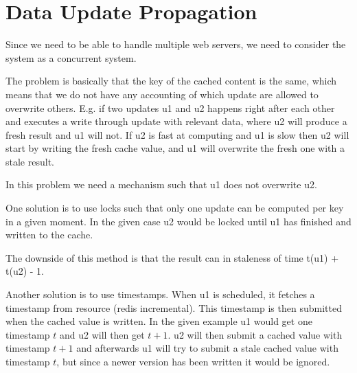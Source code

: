 \chapter{Data Update Propagation}
\label{chapter:update_propagation}

%
%
%



Since we need to be able to handle multiple web servers, we need to consider
the system as a concurrent system.

The problem is basically that the key of the cached content is the same, which
means that we do not have any accounting of which update are allowed to
overwrite others. E.g. if two updates u1 and u2 happens right after each other
and executes a write through update with relevant data, where u2 will produce
a fresh result and u1 will not. If u2 is fast at computing and u1 is slow then
u2 will start by writing the fresh cache value, and u1 will overwrite the
fresh one with a stale result.

In this problem we need a mechanism such that u1 does not overwrite u2.


One solution is to use locks such that only one update can be computed per
key in a given moment. In the given case u2 would be locked until u1 has
finished and written to the cache.

The downside of this method is that the result can in staleness of time t(u1) + t(u2) - 1.


Another solution is to use timestamps. When u1 is scheduled, it fetches a
timestamp from resource (redis incremental). This timestamp is then submitted
when the cached value is written. In the given example u1 would get one
timestamp $t$ and u2 will then get $t + 1$. u2 will then submit a cached value
with timestamp $t + 1$ and afterwards u1 will try to submit a stale cached value
with timestamp $t$, but since a newer version has been written it would be ignored.

